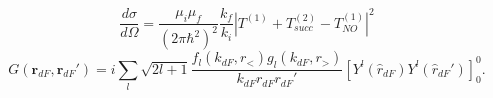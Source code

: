\documentclass[a4paper,11pt]{book}
\begin{document}
\begin{equation}
\frac{d\sigma}{d\Omega}=\frac{\mu_i\mu_f}{\left(2\pi\hbar^2\right)^2}\frac{k_f}{k_i}\left|T^{(1)}+T^{(2)}_{succ}-T^{(1)}_{NO}\right|^2
\end{equation}
\begin{equation}\label{eq7_1_12}
G(\mathbf{r}_{dF},\mathbf{r}_{dF}')=i\sum_{l}\sqrt{2l+1}
\frac{f_{l}(k_{dF},r_<)g_{l}(k_{dF},r_>)}{k_{dF}r_{dF}r_{dF}'}
\left[  Y^{l} (\hat r_{dF}) Y^{l} (\hat r_{dF}')\right]_0^0.
\end{equation}
\end{document}

